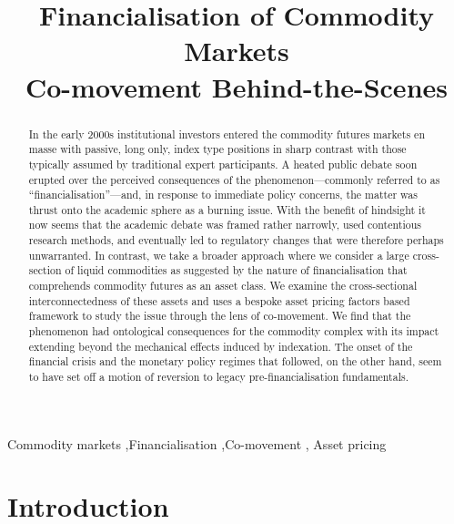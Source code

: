 \documentclass[
  authoryear,
  preprint,
  3p]{elsarticle}
\begin{document}
\begin{frontmatter}
\title{Financialisation of Commodity Markets \\\large{Co-movement
Behind-the-Scenes} }


        
\begin{abstract}
In the early 2000s institutional investors entered the commodity futures
markets en masse with passive, long only, index type positions in sharp
contrast with those typically assumed by traditional expert
participants. A heated public debate soon erupted over the perceived
consequences of the phenomenon---commonly referred to as
``financialisation''---and, in response to immediate policy concerns,
the matter was thrust onto the academic sphere as a burning issue. With
the benefit of hindsight it now seems that the academic debate was
framed rather narrowly, used contentious research methods, and
eventually led to regulatory changes that were therefore perhaps
unwarranted. In contrast, we take a broader approach where we consider a
large cross-section of liquid commodities as suggested by the nature of
financialisation that comprehends commodity futures as an asset class.
We examine the cross-sectional interconnectedness of these assets and
uses a bespoke asset pricing factors based framework to study the issue
through the lens of co-movement. We find that the phenomenon had
ontological consequences for the commodity complex with its impact
extending beyond the mechanical effects induced by indexation. The onset
of the financial crisis and the monetary policy regimes that followed,
on the other hand, seem to have set off a motion of reversion to legacy
pre-financialisation fundamentals.
\end{abstract}





\begin{keyword}
    Commodity markets \sep Financialisation \sep Co-movement \sep 
    Asset pricing
\end{keyword}
\end{frontmatter}
    

\newpage

\setlength{\parindent}{0pt}

\section{Introduction}\label{sec-introduction}
\end{document}
